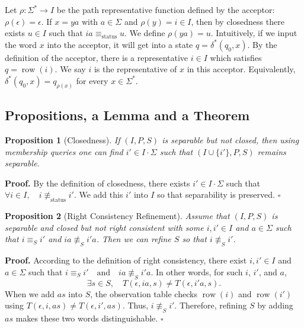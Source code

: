 \documentclass{ieice-tecrep}
\newtheorem{proposition}{Proposition}
\begin{document}
Let \(\rho:\Sigma^*\to I\) be the path representative function defined
by the acceptor: \(\rho(\epsilon)=\epsilon\). If \(x=ya\) with \(a\in\Sigma\) and \(\rho(y)=i\in I\), then by
closedness there exists \(u\in I\) such that \(ia\equiv_{\mathrm{status}}u\). We define \(\rho(ya)=u\). Intuitively, if we input the word \(x\) into the acceptor, it will get
into a state \(q = \delta^*(q_0,x)\). By the definition of the acceptor,
there is a representative \(i \in I\) which satisfies
\(q = \operatorname{row}(i)\). We say \(i\) is the representative of \(x\) in
this acceptor. Equivalently,
\(\delta^*(q_0,x)=q_{\rho(x)}\) for every \(x\in\Sigma^*\).

\subsection{Propositions, a Lemma and a Theorem}\label{propositions-lemma-and-theorem}
\begin{proposition}[Closedness]\label{proposition-1-closedness}
If \((I,P,S)\) is separable but not closed, then
using membership queries one can find \(i' \in I \cdot \Sigma\) such
that \((I \cup \{i'\}, P,S)\) remains separable.
\end{proposition}
\noindent\textbf{Proof.} By the definition of closedness, there exists
\(i' \in I \cdot \Sigma\) such that \(\forall i \in I,\quad i \not\equiv_{\mathrm{status}} i'\). We add this \(i'\) into \(I\) so that separability is preserved.
\hfill $\square$

\begin{proposition}[Right Consistency Refinement]\label{proposition-2.1-right-consistency-refinement}
Assume that \((I,P,S)\) is separable and closed but not
right consistent with some \(i,i' \in I\) and \(a\in \Sigma\) such that \(i\equiv_S i'\) and \(ia \not\equiv_S i'a\). 
Then we can refine \(S\) so that \(i \not\equiv_S i'\).
\end{proposition}
\noindent\textbf{Proof.} According to the definition of right consistency, there
exist \(i,i' \in I\) and \(a\in \Sigma\) such that \(i\equiv_S i' \quad\text{and}\quad ia \not\equiv_S i'a\). In other words, for such \(i\), \(i'\), and \(a\),
\[
\exists s \in S,\quad
T(\epsilon,ia,s) \neq T(\epsilon,i'a,s).
\]
When we add \(as\) into \(S\), the observation table checks
\(\operatorname{row}(i)\) and \(\operatorname{row}(i')\) using \(T(\epsilon,i,as) \neq T(\epsilon,i',as)\). 
Thus, \(i \not\equiv_S i'\). Therefore, refining \(S\) by adding \(as\) makes these two words
distinguishable. \hfill $\square$
\end{document}

